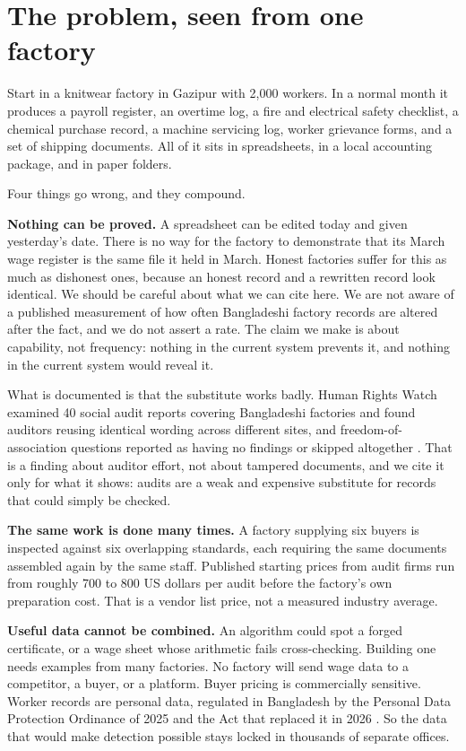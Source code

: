 \documentclass[11pt,a4paper]{article}
\begin{document}
\section{The problem, seen from one factory}

Start in a knitwear factory in Gazipur with 2{,}000 workers. In a normal month
it produces a payroll register, an overtime log, a fire and electrical safety
checklist, a chemical purchase record, a machine servicing log, worker
grievance forms, and a set of shipping documents. All of it sits in
spreadsheets, in a local accounting package, and in paper folders.

Four things go wrong, and they compound.

\textbf{Nothing can be proved.} A spreadsheet can be edited today and given
yesterday's date. There is no way for the factory to demonstrate that its March
wage register is the same file it held in March. Honest factories suffer for
this as much as dishonest ones, because an honest record and a rewritten record
look identical. We should be careful about what we can cite here. We are not
aware of a published measurement of how often Bangladeshi factory records are
altered after the fact, and we do not assert a rate. The claim we make is about
capability, not frequency: nothing in the current system prevents it, and
nothing in the current system would reveal it.

What is documented is that the substitute works badly. Human Rights Watch
examined 40 social audit reports covering Bangladeshi factories and found
auditors reusing identical wording across different sites, and
freedom-of-association questions reported as having no findings or skipped
altogether \citep{hrw2023audits}. That is a finding about auditor effort, not
about tampered documents, and we cite it only for what it shows: audits are a
weak and expensive substitute for records that could simply be checked.

\textbf{The same work is done many times.} A factory supplying six buyers is
inspected against six overlapping standards, each requiring the same documents
assembled again by the same staff. Published starting prices from audit firms
run from roughly 700 to 800 US dollars per audit before the factory's own
preparation cost. That is a vendor list price, not a measured industry average.

\textbf{Useful data cannot be combined.} An algorithm could spot a forged
certificate, or a wage sheet whose arithmetic fails cross-checking. Building one
needs examples from many factories. No factory will send wage data to a
competitor, a buyer, or a platform. Buyer pricing is commercially sensitive.
Worker records are personal data, regulated in Bangladesh by the Personal Data
Protection Ordinance of 2025 and the Act that replaced it in 2026
\citep{bd2026pdpa}. So the data that would make detection possible stays locked
in thousands of separate offices.
\end{document}
